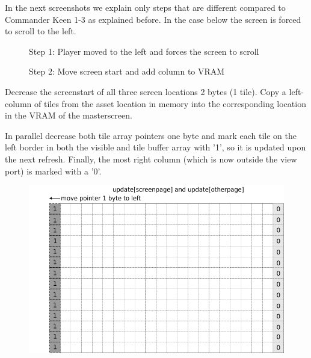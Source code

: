\documentclass[book.tex]{subfiles}
\begin{document}
In the next screenshots we explain only steps that are different compared to Commander Keen 1-3 as explained before. In the case below the screen is forced to scroll to the left.
\\

\begin{figure}[H]
\centering
 \caption{Step 1: Player moved to the left and forces the screen to scroll}
 \label{fig:kc4_6_start}
\end{figure}

\begin{figure}[H]
\centering
 \caption{Step 2: Move screen start and add column to VRAM}
 \label{fig:kc4_6_add_column}
\end{figure}


\begin{minipage}{.4\textwidth}
Decrease the screenstart of all three screen locations 2 bytes (1 tile). Copy a left-column of tiles from the asset location in memory into the corresponding location in the VRAM of the masterscreen.\\
\par
In parallel decrease both tile array pointers one byte and mark each tile on the left border in both the visible and tile buffer array with '1', so it is updated upon the next refresh.
Finally, the most right column (which is now outside the view port) is marked with a '0'.
 \end{minipage}
\begin{minipage}{.6\textwidth}
\begin{figure}[H]
  \centering
 \includegraphics[width=.9\textwidth]{screenshots_300dpi/game/Scroll_KC4_6_1-scroll_update.png}
 \label{fig:kc4_6_update_array}  
\end{figure}
\end{minipage}
\end{document}
